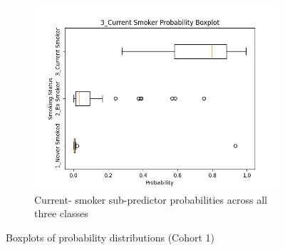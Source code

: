 \documentclass{article}
\begin{document}
\begin{figure}
    \begin{subfigure}{0.48\textwidth}
        \centering
        \includegraphics[width=\linewidth]{cohort1_3_boxplot.png}
        \caption{Current- smoker sub-predictor probabilities across all three classes}
    \end{subfigure}
    \caption{Boxplots of probability distributions (Cohort 1)}
    \label{fig:boxplot-cohort1}
\end{figure}
\end{document}
